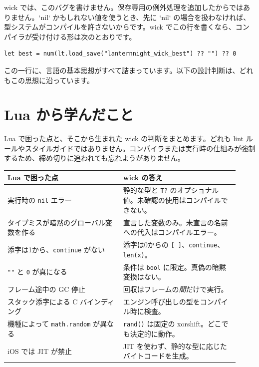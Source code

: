 wick では、このバグを書けません。保存専用の例外処理を追加したからではありません。`nil` かもしれない値を使うとき、先に `nil` の場合を扱わなければ、型システムがコンパイルを許さないからです。wick でこの行を書くなら、コンパイラが受け付ける形は次のとおりです。

\begin{lstlisting}[language=wick]
let best = num(lt.load_save("lanternnight_wick_best") ?? "") ?? 0
\end{lstlisting}

\noindent
この一行に、言語の基本思想がすべて詰まっています。以下の設計判断は、どれもこの思想に沿っています。

\section{Lua から学んだこと}

Lua で困った点と、そこから生まれた wick の判断をまとめます。どれも lint ルールやスタイルガイドではありません。コンパイラまたは実行時の仕組みが強制するため、締め切りに追われても忘れようがありません。

\begin{center}
\begin{tabular}{@{}p{0.46\linewidth}p{0.46\linewidth}@{}}
\toprule
\textbf{Lua で困った点} & \textbf{wick の答え} \\
\midrule
実行時の \texttt{nil} エラー &
静的な型と \texttt{T?} のオプショナル値。未確認の使用はコンパイルできない。 \\
タイプミスが暗黙のグローバル変数を作る &
宣言した変数のみ。未宣言の名前への代入はコンパイルエラー。 \\
添字は1から、\texttt{continue} がない &
添字は0からの \texttt{[\,]}、\texttt{continue}、\texttt{len(x)}。 \\
\texttt{""} と \texttt{0} が真になる &
条件は \texttt{bool} に限定。真偽の暗黙変換はない。 \\
フレーム途中の GC 停止 &
回収はフレームの\emph{間}だけで実行。 \\
スタック添字による C バインディング &
エンジン呼び出しの型をコンパイル時に検査。 \\
機種によって \texttt{math.random} が異なる &
\texttt{rand()} は固定の xorshift。どこでも決定的に動作。 \\
iOS では JIT が禁止 &
JIT を使わず、静的な型に応じたバイトコードを生成。 \\
\bottomrule
\end{tabular}
\end{center}

